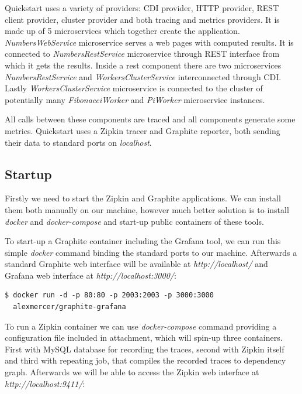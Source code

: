 \documentclass[12pt,oneside]{fithesis2}
\begin{document}
Quickstart uses a variety of providers: CDI provider, HTTP provider, REST client provider, cluster provider and both tracing and metrics providers. It is made up of 5 microservices which together create the application. \textit{NumbersWebService} microservice serves a web pages with computed results. It is connected to \textit{NumbersRestService} microservice through REST interface from which it gets the results. Inside a rest component there are two microservices \textit{NumbersRestService} and \textit{WorkersClusterService} interconnected through CDI. Lastly \textit{WorkersClusterService} microservice is connected to the cluster of potentially many \textit{FibonacciWorker} and \textit{PiWorker} microservice instances.

All calls between these components are traced and all components generate some metrics. Quickstart uses a Zipkin tracer and Graphite reporter, both sending their data to standard ports on \textit{localhost}.

\subsection{Startup}

Firstly we need to start the Zipkin and Graphite applications. We can install them both manually on our machine, however much better solution is to install \textit{docker} and \textit{docker-compose} and start-up public containers of these tools.

To start-up a Graphite container including the Grafana tool, we can run this simple \textit{docker} command binding the standard ports to our machine. Afterwards a standard Graphite web interface will be available at \textit{http://localhost/} and Grafana web interface at \textit{http://localhost:3000/}:

\begin{verbatim}
$ docker run -d -p 80:80 -p 2003:2003 -p 3000:3000
  alexmercer/graphite-grafana
\end{verbatim}

To run a Zipkin container we can use \textit{docker-compose} command providing a configuration file included in attachment, which will spin-up three containers. First with MySQL database for recording the traces, second with Zipkin itself and third with repeating job, that compiles the recorded traces to dependency graph. Afterwards we will be able to access the Zipkin web interface at \textit{http://localhost:9411/}:\newline
\end{document}
